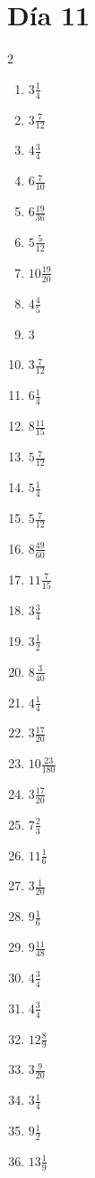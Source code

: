 \documentclass[12pt]{article}
\begin{document}
\section*{Día 11}
\begin{multicols}{2}\begin{enumerate}
\item $ 3 \frac{1}{4} $
\item $ 3 \frac{7}{12} $
\item $ 4 \frac{3}{4} $
\item $ 6 \frac{7}{10} $
\item $ 6 \frac{19}{36} $
\item $ 5 \frac{5}{12} $
\item $ 10 \frac{19}{20} $
\item $ 4 \frac{4}{5} $
\item $ 3 $
\item $ 3 \frac{7}{12} $
\item $ 6 \frac{1}{4} $
\item $ 8 \frac{11}{15} $
\item $ 5 \frac{7}{12} $
\item $ 5 \frac{1}{4} $
\item $ 5 \frac{7}{12} $
\item $ 8 \frac{49}{60} $
\item $ 11 \frac{7}{15} $
\item $ 3 \frac{3}{4} $
\item $ 3 \frac{1}{2} $
\item $ 8 \frac{3}{40} $
\item $ 4 \frac{1}{4} $
\item $ 3 \frac{17}{20} $
\item $ 10 \frac{23}{180} $
\item $ 3 \frac{17}{20} $
\item $ 7 \frac{2}{3} $
\item $ 11 \frac{1}{6} $
\item $ 3 \frac{1}{20} $
\item $ 9 \frac{1}{6} $
\item $ 9 \frac{11}{48} $
\item $ 4 \frac{3}{4} $
\item $ 4 \frac{3}{4} $
\item $ 12 \frac{8}{9} $
\item $ 3 \frac{9}{20} $
\item $ 3 \frac{1}{4} $
\item $ 9 \frac{1}{2} $
\item $ 13 \frac{1}{9} $

\end{enumerate}
\end{multicols}
\end{document}
